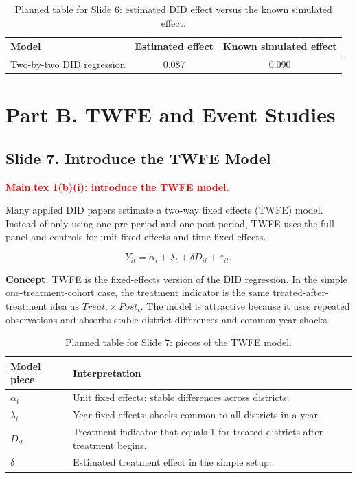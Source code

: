 \documentclass[11pt]{article}
\newcommand{\slideheading}[2]{%
  \subsection*{Slide #1. #2}
}
\newcommand{\slidecontent}[1]{#1}
\newcommand{\mainpoint}[1]{%
  \slidecontent{\textcolor{red}{\textbf{Main.tex #1}}}
}
\begin{document}
\begin{table}[H]
\centering
\small
\begin{tabular}{p{}cc}
\toprule
\textbf{Model} & \textbf{Estimated effect} & \textbf{Known simulated effect} \\
\midrule
Two-by-two DID regression & 0.087 & 0.090 \\
\bottomrule
\end{tabular}
\caption*{\footnotesize Planned table for Slide 6: estimated DID effect versus the known simulated effect.}
\end{table}

\clearpage

\section*{Part B. TWFE and Event Studies}

\slideheading{7}{Introduce the TWFE Model}
\mainpoint{1(b)(i): introduce the TWFE model.}

\slidecontent{Many applied DID papers estimate a two-way fixed effects (TWFE)
model. Instead of only using one pre-period and one post-period, TWFE uses the
full panel and controls for unit fixed effects and time fixed effects.}

\[
Y_{it} = \alpha_i + \lambda_t + \delta D_{it} + \varepsilon_{it}.
\]

\slidecontent{\textbf{Concept.} TWFE is the fixed-effects version of the DID
regression. In the simple one-treatment-cohort case, the treatment indicator is
the same treated-after-treatment idea as $Treat_i \times Post_t$. The model is
attractive because it uses repeated observations and absorbs stable district
differences and common year shocks.}

\begin{table}[H]
\centering
\small
\begin{tabular}{p{}p{}}
\toprule
\textbf{Model piece} & \textbf{Interpretation} \\
\midrule
$\alpha_i$ & Unit fixed effects: stable differences across districts. \\
$\lambda_t$ & Year fixed effects: shocks common to all districts in a year. \\
$D_{it}$ & Treatment indicator that equals 1 for treated districts after treatment begins. \\
$\delta$ & Estimated treatment effect in the simple setup. \\
\bottomrule
\end{tabular}
\caption*{\footnotesize Planned table for Slide 7: pieces of the TWFE model.}
\end{table}
\end{document}
